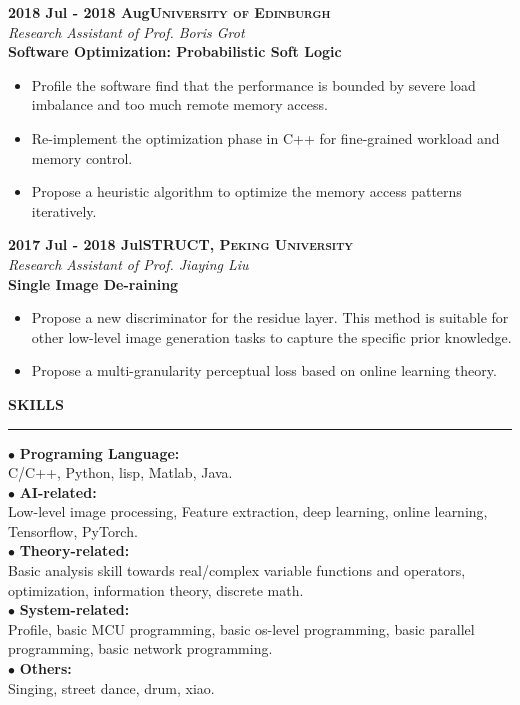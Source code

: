 \documentclass[a4paper,10pt,final]{memoir}
\newcommand{\myThemeColor}{Maroon}
\newcommand{\SmallSep}{\vspace{0.9em}}
\newcommand{\smallsep}{\vspace{0.45em}}
\newcommand{\CVSection}[1]
	{\large\textbf{\textsf{#1}}\par
	\smallsep\normalsize\normalfont}
\newcommand{\CVItem}[1]
	{\textbf{\color{\myThemeColor} #1}}
\begin{document}
\CVItem{2018 Jul - 2018 Aug\hfill\textsc{University of Edinburgh}}\\
\textit{Research Assistant of Prof. Boris Grot}\\
\textbf{Software Optimization: Probabilistic Soft Logic}
\begin{itemize}
	\vspace{-0.5em}
	\setlength{\itemsep}{0pt}
	\setlength{\parsep}{0pt}
	\setlength{\parskip}{0pt}
	\item Profile the software find that the performance is bounded by severe load imbalance and too much remote memory access.
	\item Re-implement the optimization phase in C++ for fine-grained workload and memory control.
	\item Propose a heuristic algorithm to optimize the memory access patterns iteratively.
\end{itemize}


\SmallSep
\CVItem{2017 Jul - 2018 Jul\hfill\textsc{STRUCT, Peking University}}\\
\textit{Research Assistant of Prof. Jiaying Liu}\\
\textbf{Single Image De-raining}
\begin{itemize}
	\vspace{-0.5em}
	\setlength{\itemsep}{0pt}
	\setlength{\parsep}{0pt}
	\setlength{\parskip}{0pt}
	\item Propose a new discriminator for the residue layer. This method is suitable for other low-level image generation tasks to capture the specific prior knowledge.
	\item Propose a multi-granularity perceptual loss based on online learning theory.
\end{itemize}


\SmallSep
\CVSection{SKILLS}
\hrule
\SmallSep
$\bullet$\CVItem{Programing Language:}\\ C/C++, Python, lisp, Matlab, Java.\\
$\bullet$\CVItem{AI-related:}\\ Low-level image processing, Feature extraction, deep learning, online learning, Tensorflow, PyTorch.\\
$\bullet$\CVItem{Theory-related:} \\Basic analysis skill towards real/complex variable functions and operators, optimization, information theory, discrete math.\\
$\bullet$\CVItem{System-related:}\\ Profile, basic MCU programming, basic os-level programming, basic parallel programming, basic network programming. \\
$\bullet$\CVItem{Others:}\\ Singing, street dance, drum, xiao.\\
\end{document}

